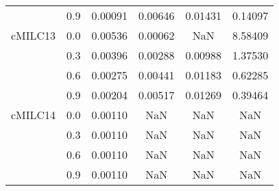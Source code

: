 \begin{longtable}{cccccc}
        & 0.9 & 0.00091 & 0.00646 & 0.01431 & 0.14097 \\
cMILC13 & 0.0 & 0.00536 & 0.00062 & NaN & 8.58409 \\
        & 0.3 & 0.00396 & 0.00288 & 0.00988 & 1.37530 \\
        & 0.6 & 0.00275 & 0.00441 & 0.01183 & 0.62285 \\
        & 0.9 & 0.00204 & 0.00517 & 0.01269 & 0.39464 \\
cMILC14 & 0.0 & 0.00110 & NaN & NaN & NaN \\
        & 0.3 & 0.00110 & NaN & NaN & NaN \\
        & 0.6 & 0.00110 & NaN & NaN & NaN \\
        & 0.9 & 0.00110 & NaN & NaN & NaN \\
\end{longtable}
